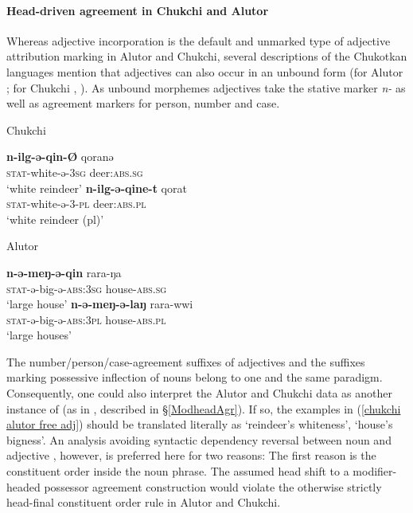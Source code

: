 \paragraph*{Head\hyp{}driven agreement in Chukchi and Alutor}
Whereas adjective incorporation is the default and unmarked type of adjective attribution marking in Alutor and Chukchi, several descriptions of the Chukotkan languages mention that adjectives can also occur in an unbound form (for Alutor \citealt{nagayama2003}; for Chukchi \citealt[103–104, 421–429]{skorik1960}, \citealt[251]{comrie1981}). As unbound morphemes adjectives take the stative marker \textit{n-} as well as agreement markers for person, number and case.
\begin{exe}
\ex \label{chukchi alutor free adj}
\begin{xlist}
\ex \rm{Chukchi \citep{skorik1960}}
\begin{xlist}
\ex
\gll	\textbf{n-ilg-ə-qin-Ø} qoranə\\
	\textsc{stat}-white-ə-\textsc{3sg} deer:\textsc{abs.sg}\\
\glt	‘white reindeer’
\ex
\gll	\textbf{n-ilg-ə-qine-t} qorat\\
	\textsc{stat}-white-ə-3-\textsc{pl} deer:\textsc{abs.pl}\\
\glt	‘white reindeer (pl)’
\end{xlist}
\ex \rm{Alutor \citep{nagayama2003}}
\begin{xlist}
\ex
\gll	\textbf{n-ə-meŋ-ə-qin} rara-ŋa\\
	\textsc{stat}-ə-big-ə-\textsc{abs:3sg} house-\textsc{abs.sg}\\
\glt	‘large house’
\ex
\gll	\textbf{n-ə-meŋ-ə-laŋ} rara-wwi\\
	\textsc{stat}-ə-big-ə-\textsc{abs:3pl} house-\textsc{abs.pl}\\
\glt	‘large houses’
\end{xlist}
\end{xlist}
\end{exe}
The number/person/case-agreement suffixes of adjectives and the suffixes marking possessive inflection of nouns belong to one and the same paradigm. Consequently, one could also interpret the Alutor and Chukchi data as another instance of  (as in , described in \S\ref{ModheadAgr}). If so, the examples in (\ref{chukchi alutor free adj}) should be translated literally as ‘reindeer's whiteness’, ‘house's bigness’. An analysis avoiding syntactic dependency reversal between noun and adjective \citep[cf.][]{malchukov2000}, however, is preferred here for two reasons: The first reason is the constituent order inside the noun phrase. The assumed head shift to a modifier\hyp{}headed possessor agreement construction would violate the otherwise strictly head-final constituent order rule in Alutor and Chukchi. 

